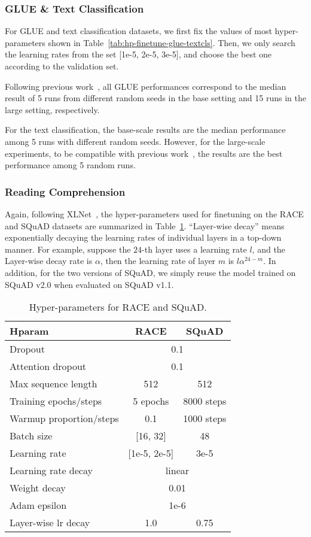 \documentclass{article}
\theoremstyle{custom}
\begin{document}
\subsubsection{GLUE \& Text Classification}
For GLUE and text classification datasets, we first fix the values of most hyper-parameters shown in Table~\ref{tab:hp-finetune-glue-textcls}.
Then, we only search the learning rates from the set [1e-5, 2e-5, 3e-5], and choose the best one according to the validation set.

Following previous work~\cite{yang2019xlnet,liu2019roberta,clark2020electra}, all GLUE performances correspond to the median result of 5 runs from different random seeds in the base setting and 15 runs in the large setting, respectively.

For the text classification, the base-scale results are the median performance among 5 runs with different random seeds.
However, for the large-scale experiments, to be compatible with previous work~\cite{xie2019unsupervised,yang2019xlnet}, the results are the best performance among 5 random runs.

\subsubsection{Reading Comprehension}
Again, following XLNet~\cite{yang2019xlnet}, the hyper-parameters used for finetuning on the RACE and SQuAD datasets are summarized in Table~\ref{tab:hp-finetune}.
``Layer-wise decay'' means exponentially decaying the learning rates of individual layers in a top-down manner.
For example, suppose the $24$-th layer uses a learning rate $l$, and the Layer-wise decay rate is $\alpha$, then the learning rate of layer $m$ is $l \alpha^{24 - m}$.
In addition, for the two versions of SQuAD, we simply reuse the model trained on SQuAD v2.0 when evaluated on SQuAD v1.1.
\begin{table}[!h]
\centering
\begin{tabular}{lcc}
	\toprule
	\bf Hparam & \bf RACE & \bf SQuAD \\
	\midrule
	Dropout                 & \multicolumn{2}{c}{0.1}    \\
	Attention dropout       & \multicolumn{2}{c}{0.1}    \\
	Max sequence length     & 512          & 512 \\
	Training epochs/steps   & 5 epochs     & 8000 steps \\
	Warmup proportion/steps & 0.1          & 1000 steps \\
	Batch size              & [16, 32]     & 48 \\
	Learning rate           & [1e-5, 2e-5] & 3e-5 \\
	Learning rate decay     & \multicolumn{2}{c}{linear} \\
	Weight decay            & \multicolumn{2}{c}{0.01}   \\
	Adam epsilon            & \multicolumn{2}{c}{1e-6}   \\
	Layer-wise lr decay     & 1.0 & 0.75 \\
	\bottomrule
\end{tabular}
\caption{Hyper-parameters for RACE and SQuAD.}
\label{tab:hp-finetune}
\end{table}
\end{document}
